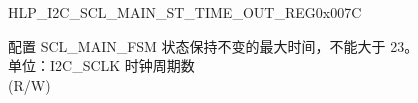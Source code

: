 \begin{register}{H}{LP\_I2C\_SCL\_MAIN\_ST\_TIME\_OUT\_REG}{0x007C}\label{regdesc:LPI2CSCLMAINSTTIMEOUTREG}
%
%
\regnewline%
\begin{regdesc}\begin{reglist}
\label{fielddesc:LPI2CSCLMAINSTTOI2C}\item [LP\_I2C\_SCL\_MAIN\_ST\_TO\_I2C] 配置 SCL\_MAIN\_FSM 状态保持不变的最大时间，不能大于 23。\\
单位：I2C\_SCLK 时钟周期数 \\ (R/W)
\end{reglist}\end{regdesc}
\end{register}


